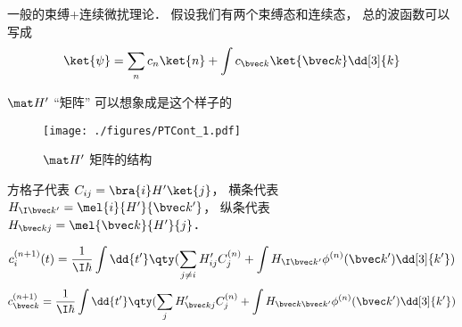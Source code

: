 
\begin{issues}
\end{issues}


一般的束缚+连续微扰理论． 假设我们有两个束缚态和连续态， 总的波函数可以写成
\begin{equation}
\ket{\psi} = \sum_n c_n\ket{n} + \int c_{\bvec k}\ket{\bvec k} \dd[3]{k}
\end{equation}

$\mat H'$  “矩阵” 可以想象成是这个样子的
\begin{figure}[ht]
\centering
\texttt{[image: ./figures/PTCont\_1.pdf]}
\caption{$\mat H'$ 矩阵的结构} 
\end{figure}

方格子代表 $C_{ij} = \bra{i} H' \ket{j}$， 横条代表 $H_{\I\bvec k'} = \mel{i}{H'}{\bvec k'}$，  纵条代表 $H_{\bvec k j} = \mel{\bvec k}{H'}{j}$． 

\begin{equation}
c_i^{(n + 1)}(t) = \frac{1}{\I\hbar} \int \dd{t'} \qty(\sum_{j \ne i} H'_{ij} C_j^{(n)} + \int H_{\I\bvec k'} \phi ^{(n)} (\bvec k') \dd[3]{k'} )
\end{equation}
\begin{equation}
c^{(n+1)}_{\bvec k} = \frac{1}{\I\hbar} \int \dd{t'} \qty(\sum_j H'_{\bvec kj} C_j^{(n)} + \int H_{\bvec k\bvec k'} \phi ^{(n)}(\bvec k') \dd[3]{k'})
\end{equation}
